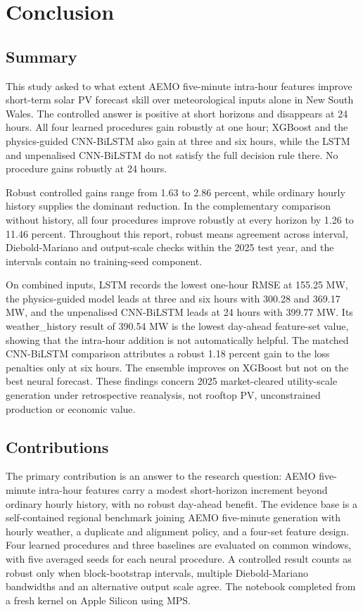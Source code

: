 \section{Conclusion}

\subsection{Summary}

This study asked to what extent AEMO five-minute intra-hour features improve short-term solar PV forecast skill over meteorological inputs alone in New South Wales. The controlled answer is positive at short horizons and disappears at 24 hours. All four learned procedures gain robustly at one hour; XGBoost and the physics-guided CNN-\allowbreak{}BiLSTM also gain at three and six hours, while the LSTM and unpenalised CNN-\allowbreak{}BiLSTM do not satisfy the full decision rule there. No procedure gains robustly at 24 hours.

Robust controlled gains range from 1.63 to 2.86 percent, while ordinary hourly history supplies the dominant reduction. In the complementary comparison without history, all four procedures improve robustly at every horizon by 1.26 to 11.46 percent. Throughout this report, robust means agreement across interval, Diebold-Mariano and output-scale checks within the 2025 test year, and the intervals contain no training-seed component.

On combined inputs, LSTM records the lowest one-hour RMSE at 155.25 MW, the physics-guided model leads at three and six hours with 300.28 and 369.17 MW, and the unpenalised CNN-\allowbreak{}BiLSTM leads at 24 hours with 399.77 MW. Its weather\_\allowbreak{}history result of 390.54 MW is the lowest day-ahead feature-set value, showing that the intra-hour addition is not automatically helpful. The matched CNN-\allowbreak{}BiLSTM comparison attributes a robust 1.18 percent gain to the loss penalties only at six hours. The ensemble improves on XGBoost but not on the best neural forecast. These findings concern 2025 market-cleared utility-scale generation under retrospective reanalysis, not rooftop PV, unconstrained production or economic value.

\subsection{Contributions}

The primary contribution is an answer to the research question: AEMO five-minute intra-hour features carry a modest short-horizon increment beyond ordinary hourly history, with no robust day-ahead benefit. The evidence base is a self-contained regional benchmark joining AEMO five-minute generation with hourly weather, a duplicate and alignment policy, and a four-set feature design. Four learned procedures and three baselines are evaluated on common windows, with five averaged seeds for each neural procedure. A controlled result counts as robust only when block-bootstrap intervals, multiple Diebold-Mariano bandwidths and an alternative output scale agree. The notebook completed from a fresh kernel on Apple Silicon using MPS.

